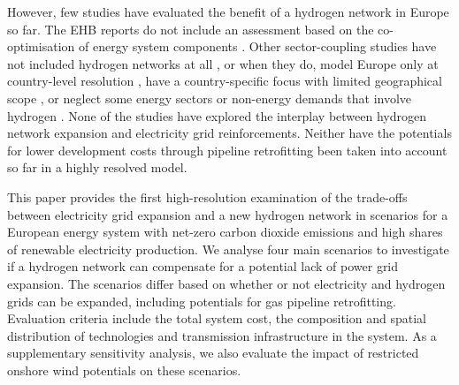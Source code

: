 However, few studies have evaluated the benefit of a hydrogen network in Europe
so far. The EHB reports do not include an assessment based on the
co-optimisation of energy system components
\cite{gasforclimateEuropeanHydrogen2020,gasforclimateEuropeanHydrogen2021,gasforclimateExtendingEuropean2021,gasforclimateEuropeanHydrogen2022}.
Other sector-coupling studies have not included hydrogen networks at all
\cite{brownSynergiesSector2018,pickeringDiversityOptions}, or when they do,
model Europe only at country-level resolution
\cite{europeancommission.directorategeneralforenergy.METISStudy2021,victoriaSpeedTechnological2021},
have a country-specific focus with limited geographical scope
\cite{gilsInteractionHydrogen2021}, or neglect some energy sectors or non-energy
demands that involve hydrogen
\cite{gilsInteractionHydrogen2021,Caglayan2019,caglayanRobustDesign2021}. None
of the studies have explored the interplay between hydrogen network expansion
and electricity grid reinforcements. Neither have the potentials for lower
development costs through pipeline retrofitting been taken into account so far
in a highly resolved model.

This paper provides the first high-resolution examination of the trade-offs
between electricity grid expansion and a new hydrogen network in scenarios for a
European energy system with net-zero carbon dioxide emissions and high shares of
renewable electricity production. We analyse four main scenarios to investigate
if a hydrogen network can compensate for a potential lack of power grid
expansion. The scenarios differ based on whether or not electricity and hydrogen
grids can be expanded, including potentials for gas pipeline retrofitting.
Evaluation criteria include the total system cost, the composition and spatial
distribution of technologies and transmission infrastructure in the system. As a
supplementary sensitivity analysis, we also evaluate the impact of restricted
onshore wind potentials on these scenarios.

